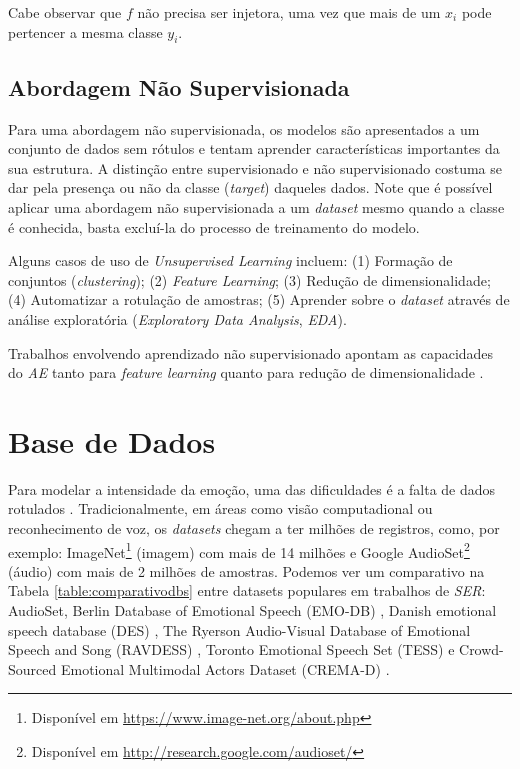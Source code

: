 Cabe observar que $f$ não precisa ser injetora, uma vez que mais de um $x_i$ pode pertencer a mesma classe $y_i$.

\subsection{Abordagem Não Supervisionada}

Para uma abordagem não supervisionada, os modelos são apresentados a um conjunto de dados sem rótulos e tentam aprender características importantes da sua estrutura. A distinção entre supervisionado e não supervisionado costuma se dar pela presença ou não da classe (\textit{target}) daqueles dados. Note que é possível aplicar uma abordagem não supervisionada a um \textit{dataset} mesmo quando a classe é conhecida, basta excluí-la do processo de treinamento do modelo.

Alguns casos de uso de \textit{Unsupervised Learning} incluem: (1) Formação de conjuntos (\textit{clustering}); (2) \textit{Feature Learning}; (3) Redução de dimensionalidade; (4) Automatizar a rotulação de amostras; (5) Aprender sobre o \textit{dataset} através de análise exploratória (\textit{Exploratory Data Analysis}, \textit{EDA}).

Trabalhos envolvendo aprendizado não supervisionado apontam as capacidades do \textit{AE} tanto para \textit{feature learning} \cite{35.16} \cite{35.17} quanto para redução de dimensionalidade \cite{35.18} \cite{35.19}.

\section{Base de Dados}

Para modelar a intensidade da emoção, uma das dificuldades é a falta de dados rotulados \cite{18}. Tradicionalmente, em áreas como visão computadional ou reconhecimento de voz, os \textit{datasets} chegam a ter milhões de registros, como, por exemplo: ImageNet\footnote{Disponível em \url{https://www.image-net.org/about.php}} (imagem) com  mais de 14 milhões e Google AudioSet\footnote{Disponível em \url{http://research.google.com/audioset/}} (áudio) com mais de 2 milhões de amostras. Podemos ver um comparativo na Tabela \ref{table:comparativodbs} entre datasets populares \cite{32} em trabalhos de \textit{SER}: AudioSet, Berlin Database of Emotional Speech (EMO-DB) \cite{32.55}, Danish emotional speech database (DES) \cite{32.56}, The Ryerson Audio-Visual Database of Emotional Speech and Song (RAVDESS) \cite{32.57}, Toronto Emotional Speech Set (TESS) \cite{32.58} e Crowd-Sourced Emotional Multimodal Actors Dataset (CREMA-D) \cite{32.59}.

